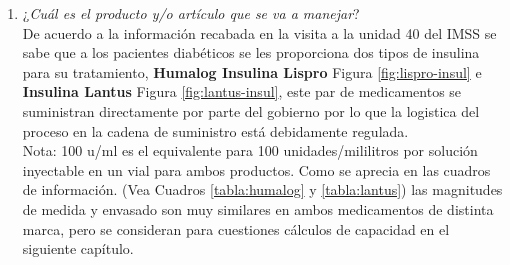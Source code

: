\begin{enumerate}
	\item ¿\textit{Cuál es el producto y/o artículo que se va a manejar}?\\ De acuerdo a la información recabada en la visita a la unidad 40 del IMSS se sabe que a los pacientes diabéticos se les proporciona dos tipos de insulina para su tratamiento, \textbf{Humalog Insulina Lispro} Figura \ref{fig:lispro-insul} e \textbf{Insulina Lantus}  Figura \ref{fig:lantus-insul}, este par de medicamentos se suministran directamente por parte del gobierno por lo que la logistica del proceso en la cadena de suministro está debidamente regulada. \\ 
	Nota: 100 u/ml es el equivalente para 100 unidades/mililitros por solución inyectable en un vial para ambos productos. Como se aprecia en las cuadros de información. (Vea Cuadros  \ref{tabla:humalog} y \ref{tabla:lantus})  las magnitudes de medida y envasado son muy similares en ambos medicamentos de distinta marca, pero se consideran para cuestiones cálculos de capacidad en el siguiente capítulo.\rsp
		

\end{enumerate}
